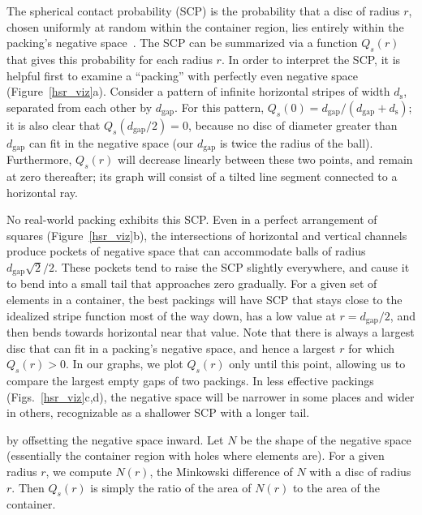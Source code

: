The spherical contact probability (SCP) is the probability that a 
disc of radius $r$, chosen
uniformly at random within the container region, lies entirely within the 
packing's negative space~\cite{Chiu2013}.
The SCP can be summarized via a function $Q_s(r)$ that gives this 
probability for each radius $r$.
In order to interpret the SCP, it is helpful first to
examine a ``packing'' with perfectly even negative space (Figure~\ref{hsr_viz}a).
Consider a pattern of infinite horizontal stripes of width $d_\mathrm{s}$,
separated from each other by $d_\mathrm{gap}$.  For this pattern,
$Q_s(0)=d_\mathrm{gap}/(d_\mathrm{gap}+d_\mathrm{s})$; it is also
clear that $Q_s(d_\mathrm{gap}/2)=0$, because no disc of diameter greater
than $d_\mathrm{gap}$ can fit in the negative space
(our $d_\mathrm{gap}$ is twice the radius of the ball).
Furthermore,
$Q_s(r)$ will decrease linearly between these two points, and remain
at zero thereafter; its graph will consist of a tilted line segment
connected to a horizontal ray.

No real-world packing exhibits this SCP.  Even in a perfect arrangement
of squares (Figure~\ref{hsr_viz}b), the intersections of horizontal and
vertical channels
produce pockets of negative space that can accommodate balls of
radius $d_\mathrm{gap}\sqrt{2}/2$.  These pockets tend to raise the SCP
slightly everywhere, and cause it to bend into a small tail that
approaches zero gradually.
For a given set of elements in a container, the best packings will
have  SCP that stays close to the idealized stripe function most
of the way down, has a low value at $r=d_\mathrm{gap}/2$,
and then bends towards horizontal near that value.
Note that there is always a largest disc that can fit in a packing's
negative space, and hence a largest $r$ for which $Q_s(r)>0$.  
In our graphs, we plot $Q_s(r)$ only until this point, allowing us
to compare the largest empty gaps of two packings.
In less effective packings (Figs.~\ref{hsr_viz}c,d), the negative space 
will be narrower in
some places and wider in others, recognizable as a shallower SCP
with a longer tail.

 by offsetting the negative
space inward.  Let $N$ be the shape of the negative space (essentially
the container region with holes where elements are).  For a given radius
$r$, we compute $N(r)$, the Minkowski difference of $N$ with a disc of
radius $r$.  Then $Q_s(r)$ is simply the ratio of the area of $N(r)$ to
the area of the container.

